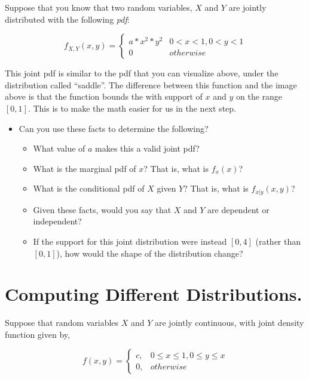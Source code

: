 \documentclass[
]{book}
\providecommand{\tightlist}{%
  \setlength{\itemsep}{0pt}\setlength{\parskip}{0pt}}
\theoremstyle{definition}
\theoremstyle{definition}
\theoremstyle{definition}
\theoremstyle{definition}
\theoremstyle{remark}
\begin{document}
Suppose that you know that two random variables, \(X\) and \(Y\) are jointly distributed with the following \emph{pdf}:

\[
f_{X,Y}(x,y) = 
  \begin{cases}
    a * x^{2} * y^{2} & 0 < x < 1, 0 < y < 1 \\
    0 & otherwise
  \end{cases}
\]

This joint pdf is similar to the pdf that you can visualize above, under the distribution called ``saddle''. The difference between this function and the image above is that the function bounds the with support of \(x\) and \(y\) on the range \([0,1]\). This is to make the math easier for us in the next step.

\begin{itemize}
\tightlist
\item
  Can you use these facts to determine the following?

  \begin{itemize}
  \tightlist
  \item
    What value of \(a\) makes this a valid joint pdf?
  \item
    What is the marginal pdf of \(x\)? That is, what is \(f_{x}(x)\)?
  \item
    What is the conditional pdf of \(X\) given \(Y\)? That is, what is \(f_{x|y}(x,y)\)?
  \item
    Given these facts, would you say that \(X\) and \(Y\) are dependent or independent?
  \item
    If the support for this joint distribution were instead \([0,4]\) (rather than \([0,1]\)), how would the shape of the distribution change?
  \end{itemize}
\end{itemize}

\section{Computing Different Distributions.}\label{computing-different-distributions.}

Suppose that random variables \(X\) and \(Y\) are jointly continuous, with joint density function given by,

\[
f(x,y) = 
  \begin{cases}
    c, & 0 \leq x \leq 1, 0 \leq y \leq x \\
    0, & otherwise
\end{cases}
\]
\end{document}
